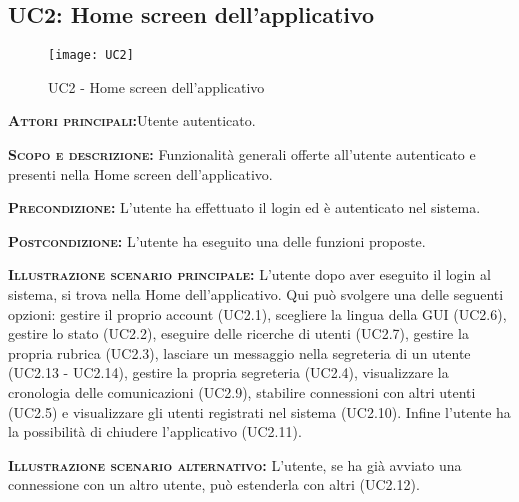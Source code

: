 \subsection{UC2: Home screen dell'applicativo}
\begin{figure}[H]
\begin{center}
\texttt{[image: UC2]}
\caption{UC2 - Home screen dell'applicativo}\label{fig:home}
\end{center}
\end{figure}
\begin{description}
\item{\scshape\bfseries Attori principali:}Utente autenticato.
\item{\scshape\bfseries Scopo e descrizione:} Funzionalità generali offerte all'utente autenticato e presenti nella Home screen dell'applicativo.
\item{\scshape\bfseries Precondizione:} L'utente ha effettuato il login ed è autenticato nel sistema.
\item{\scshape\bfseries Postcondizione:} L'utente ha eseguito una delle funzioni proposte.
\item{\scshape\bfseries Illustrazione scenario principale:} L'utente dopo aver eseguito il login al sistema, si trova nella Home dell'applicativo. Qui può svolgere una delle seguenti opzioni: gestire il proprio account (UC2.1), scegliere la lingua della GUI (UC2.6), gestire lo stato (UC2.2), eseguire delle ricerche di utenti (UC2.7), gestire la propria rubrica (UC2.3), lasciare un messaggio nella segreteria di un utente (UC2.13 - UC2.14), gestire la propria segreteria (UC2.4), visualizzare la cronologia delle comunicazioni (UC2.9), stabilire connessioni con altri utenti (UC2.5) e  visualizzare gli utenti registrati nel sistema  (UC2.10). Infine l'utente ha la possibilità di chiudere l'applicativo (UC2.11).
\item{\scshape\bfseries Illustrazione scenario alternativo:} L'utente, se ha già avviato una connessione con un altro utente, può estenderla con altri (UC2.12).
\end{description}

